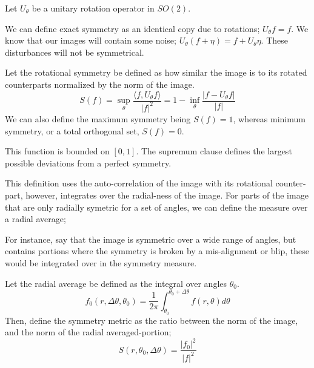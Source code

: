 Let $U_\theta$ be a unitary rotation operator in $SO(2)$.

We can define exact symmetry as an identical copy due to rotations; $U_\theta f = f$. We know that our images will contain some noise; $U_\theta (f + \eta) = f + U_\theta \eta$. These disturbances will not be symmetrical. 

\begin{definition}
    Let the rotational symmetry be defined as how similar the image is to its rotated counterparts normalized by the norm of the image. 
    \begin{equation}
        S(f) = \sup_\theta \frac{\langle f, U_\theta f\rangle}{|f|^2} = 1 - \inf_\theta \frac{| f- U_\theta f|}{|f|}
    \end{equation}
    We can also define the maximum symmetry being $S(f) = 1$, whereas minimum symmetry, or a total orthogonal set, $S(f) = 0$.
\end{definition}
This function is bounded on $[0, 1]$. The supremum clause defines the largest possible deviations from a perfect symmetry. 

This definition uses the auto-correlation of the image with its rotational counter-part, however, integrates over the radial-ness of the image. For parts of the image that are only radially symetric for a set of angles, we can define the measure over a radial average;

For instance, say that the image is symmetric over a wide range of angles, but contains portions where the symmetry is broken by a mis-alignment or blip, these would be integrated over in the symmetry measure. 

\begin{definition}
    Let the radial average be defined as the integral over angles $\theta_0$.
    \begin{equation}
        f_0(r, \Delta \theta, \theta_0) = \frac{1}{2\pi}\int_{\theta_0}^{\theta_0 + \Delta \theta}f(r,\theta) d\theta 
    \end{equation}
    Then, define the symmetry metric as the ratio between the norm of the image, and the norm of the radial averaged-portion;
    \begin{equation}
        S(r,\theta_0, \Delta \theta) = \frac{|f_0|^2}{|f|^2}
    \end{equation}
\end{definition}
